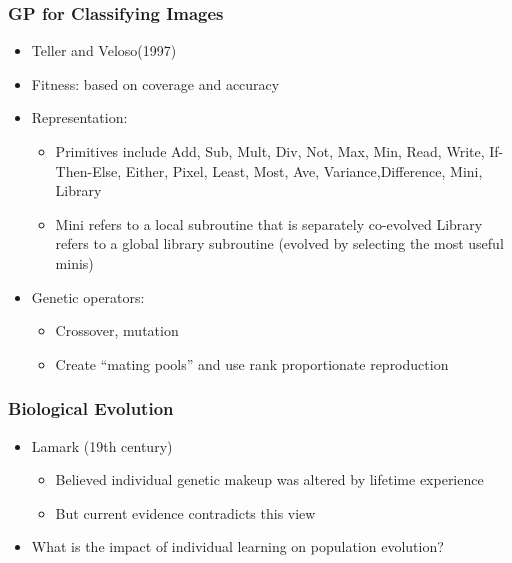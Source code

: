 \documentclass{beamer}
\begin{document}
\begin{frame}
\frametitle{GP for Classifying Images}
\label{sec-6-8}


\begin{itemize}
\item Teller and Veloso(1997)
\item Fitness:
   based on coverage and accuracy
\item Representation:
\begin{itemize}
\item Primitives include Add, Sub, Mult, Div, Not, Max, Min, Read, Write, 
    If-Then-Else, Either, Pixel, Least, Most, Ave, Variance,Difference, Mini, Library
\item Mini refers to a local subroutine that is separately co-evolved Library 
    refers to a global library subroutine (evolved by selecting the most useful minis)
\end{itemize}
\item Genetic operators:
\begin{itemize}
\item Crossover, mutation
\item Create ``mating pools'' and use rank proportionate reproduction
\end{itemize}
\end{itemize}
\end{frame}
\begin{frame}
\frametitle{Biological Evolution}
\label{sec-6-9}


\begin{itemize}
\item Lamark (19th century)
\begin{itemize}
\item Believed individual genetic makeup was altered by lifetime experience
\item But current evidence contradicts this view
\end{itemize}
\item What is the impact of individual learning on population evolution?
\end{itemize}
\end{frame}
\end{document}
